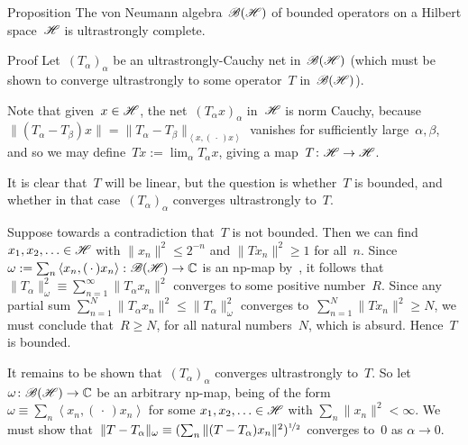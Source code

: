 \documentclass[a]{subfiles}
\begin{document}
\begin{parsec}%
\begin{point}[bh-us-complete]{Proposition}%
The von Neumann algebra~$\mathscr{B}(\mathscr{H})$
of bounded operators on a Hilbert space~$\mathscr{H}$
is ultrastrongly complete.
\begin{point}{Proof}
Let~$(T_\alpha)_\alpha$ be an ultrastrongly-Cauchy net
in~$\mathscr{B}(\mathscr{H})$
(which must be shown to converge ultrastrongly to
some operator~$T$ in~$\mathscr{B}(\mathscr{H})$).

Note that given~$x\in \mathscr{H}$,
the net~$(T_\alpha x)_\alpha$ in~$\mathscr{H}$
is norm Cauchy,
because $\|(T_\alpha-T_\beta) x\|
= \| T_\alpha-T_\beta \|_{\left<x,(\,\cdot\,)x\right>}$
vanishes for sufficiently large~$\alpha,\beta$,
and so we may define~$Tx :=\lim_\alpha T_\alpha x$,
giving a map~$T\colon \mathscr{H}\to\mathscr{H}$.

It is clear that~$T$ will be linear,
but the question is whether~$T$ is bounded,
and whether in that 
case~$(T_\alpha)_\alpha$ converges ultrastrongly to~$T$.

Suppose towards a contradiction that~$T$ is not bounded.
Then we can find~$x_1,x_2,\dotsc\in\mathscr{H}$
with $\|x_n\|^2\leq 2^{-n}$
and $\|Tx_n\|^2\geq 1$ for all~$n$.
Since~$\omega:=\sum_n \left<x_n,(\,\cdot\,)x_n\right>\colon 
\mathscr{B}(\mathscr{H})\to\mathbb{C}$
is an np-map by~\TODO{}, 
it follows that~$\|T_\alpha\|_\omega^2\equiv \sum_{n=1}^\infty 
\|T_\alpha x_n\|^2$
converges to some positive number~$R$.
Since any partial sum $\sum_{n=1}^N \|T_\alpha x_n\|^2
\leq \|T_\alpha\|_\omega^2$
converges to~$\sum_{n=1}^N \|T x_n\|^2\geq N$,
we must conclude that~$R\geq N$,
for all natural numbers~$N$,
which is absurd.
Hence~$T$ is bounded.

It remains to be shown that~$(T_\alpha)_\alpha$
converges ultrastrongly to~$T$.
So let $\omega\colon \mathscr{B}(\mathscr{H})\to\mathbb{C}$ be an arbitrary
np-map,
being of the form~$\omega\equiv \sum_n\left<x_n,(\,\cdot\,)x_n\right>$
for some $x_1,x_2,\dotsc\in\mathscr{H}$ with $\sum_n \|x_n\|^2 <\infty$.
We must show that~$\|T-T_\alpha\|_\omega
\equiv (\sum_n \|(T-T_\alpha)x_n\|^2)^{\nicefrac{1}{2}}$ 
converges to~$0$ as $\alpha\to 0$.


\end{point}
\end{point}
\end{parsec}
\end{document}
